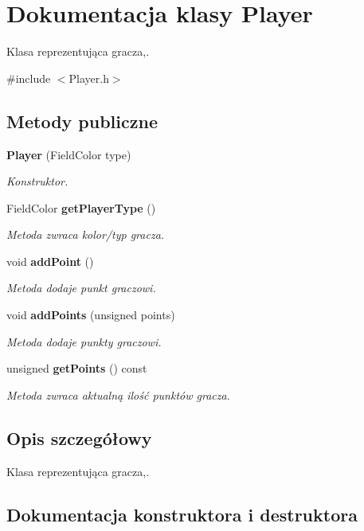 \section{Dokumentacja klasy Player}
\label{class_player}


Klasa reprezentująca gracza,.  




{\ttfamily \#include $<$Player.\+h$>$}

\subsection*{Metody publiczne}
\begin{DoxyCompactItemize}
\item 
\textbf{ Player} (Field\+Color type)
\begin{DoxyCompactList}\small\item\em Konstruktor. \end{DoxyCompactList}\item 
Field\+Color \textbf{ get\+Player\+Type} ()
\begin{DoxyCompactList}\small\item\em Metoda zwraca kolor/typ gracza. \end{DoxyCompactList}\item 
void \textbf{ add\+Point} ()
\begin{DoxyCompactList}\small\item\em Metoda dodaje punkt graczowi. \end{DoxyCompactList}\item 
void \textbf{ add\+Points} (unsigned points)
\begin{DoxyCompactList}\small\item\em Metoda dodaje punkty graczowi. \end{DoxyCompactList}\item 
unsigned \textbf{ get\+Points} () const
\begin{DoxyCompactList}\small\item\em Metoda zwraca aktualną ilość punktów gracza. \end{DoxyCompactList}\end{DoxyCompactItemize}


\subsection{Opis szczegółowy}
Klasa reprezentująca gracza,. 

\subsection{Dokumentacja konstruktora i destruktora}
\mbox{\label{class_player_a06c14a5c2a7136eaedb70fbff7443c07}} 
